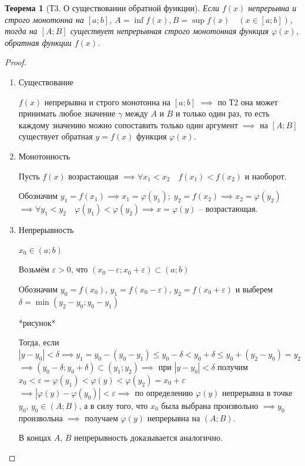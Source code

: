 \documentclass[a4paper,oneside]{article}
\newcommand{\eps}{\varepsilon}
\newtheorem{theorem}{Теорема}[subsection]
\theoremstyle{definition}
\theoremstyle{definition}
\theoremstyle{definition}
\begin{document}
\begin{theorem}[Т3. О существовании обратной функции]
    Если $f(x)$ непрерывна и строго монотонна на $[a; b]$, 
    $A = \inf f(x), B = \sup f(x) \quad (x \in [a; b])$,
    тогда на $[A; B]$ существует непрерывная строго монотонная функция
    $\varphi(x)$, обратная функции $f(x)$.
\end{theorem}
\begin{proof}\ \\
    \begin{enumerate}
        \item 
            Существование
        
            $f(x)$ непрерывна и строго монотонна на $[a; b]$ $\implies$ по Т2 она может
            принимать любое значение $\gamma$ между $A$ и $B$ и только один раз, то есть каждому
            значению можно сопоставить только один аргумент $\implies$ на $[A; B]$ существует
            обратная $y = f(x)$ функция $\varphi(x)$.

        \item
            Монотонность

            Пусть $f(x)$ возрастающая $\implies \forall x_1 < x_2 \quad f(x_1) < f(x_2)$ и наоборот.

            Обозначим $y_1 = f(x_1) \implies x_1 = \varphi(y_1); \; y_2 = f(x_2) \implies x_2 = \varphi(y_2)$
            $\implies \forall y_1 < y_2 \quad \varphi(y_1) < \varphi(y_2) \implies x = \varphi(y)$ -- возрастающая.
        
        \item
            Непрерывность

            $x_0 \in (a; b)$

            Возьмём $\eps > 0$, что $(x_0 - \eps; x_0 + \eps) \subset (a; b)$

            Обозначим $y_0 = f(x_0), \, y_1 = f(x_0 - \eps), \, y_2 = f(x_0 + \eps)$
            и выберем $\delta = \min (y_2 - y_0; y_0 - y_1)$

            *рисунок*

            Тогда, если $|y - y_0| < \delta \implies 
            y_1 = y_0 - (y_0 - y_1) \le y_0 - \delta < y_0 + \delta \le y_0 + (y_2 - y_0) = y_2$
            $\implies (y_0 - \delta; y_0 + \delta) \subset (y_1; y_2) \implies$ при
            $|y - y_0| < \delta$ получим $x_0 < \eps = \varphi(y_1) < \varphi(y) < \varphi(y_2) = x_0 + \eps$
            $\implies |\varphi(y) - \varphi(y_0)| < \eps \implies$ по определению $\varphi(y)$
            непрерывна в точке $y_0$, $y_0 \in (A; B)$, а в силу того, что $x_0$ была выбрана
            произвольно $\implies y_0$ произвольна $\implies$ получаем $\varphi(y)$ непрерывна на $(A; B)$.

            В концах $A$, $B$ непрерывность доказывается аналогично.
        \end{enumerate}
\end{proof}
\end{document}
